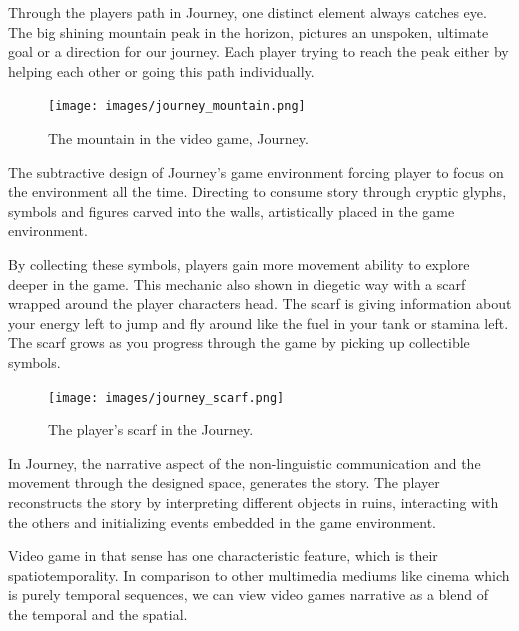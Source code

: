             Through the players path in Journey, one distinct element always catches eye. The big shining mountain peak in the horizon, pictures an unspoken, ultimate goal or a direction for our journey. Each player trying to reach the peak either by helping each other or going this path individually.\par

            \begin{figure}[H]
                \centering
                \texttt{[image: images/journey\_mountain.png]}
                \caption{The mountain in the video game, Journey.}
                \label{fig:JOURNEY_MOUNTAIN}
            \end{figure}

            The subtractive design of Journey's game environment forcing player to focus on the environment all the time. Directing to consume story through cryptic glyphs, symbols and figures carved into the walls, artistically placed in the game environment.\par

            By collecting these symbols, players gain more movement ability to explore deeper in the game. This mechanic also shown in diegetic way with a scarf wrapped around the player characters head. The scarf is giving information about your energy left to jump and fly around like the fuel in your tank or stamina left. The scarf grows as you progress through the game by picking up collectible symbols.\par

            \begin{figure}[H]
                \centering
                \texttt{[image: images/journey\_scarf.png]}
                \caption{The player's scarf in the Journey.}
                \label{fig:JOURNEY_SCARF}
            \end{figure}      

            In Journey, the narrative aspect of the non-linguistic communication and the movement through the designed space, generates the story. The player reconstructs the story by interpreting different objects in ruins, interacting with the others and initializing events embedded in the game environment.\par

            Video game in that sense has one characteristic feature, which is their spatiotemporality. In comparison to other multimedia mediums like cinema which is purely temporal sequences, we can view video games narrative as a blend of the temporal and the spatial\cite{Liminal_Space_Between_Embedded_and_Emergent_Narrative}.
